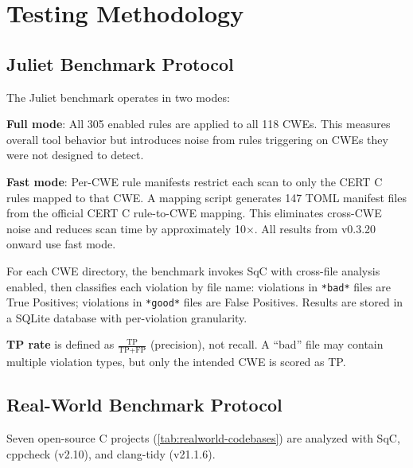 \section{Testing Methodology}
\label{sec:methodology}

\subsection{Juliet Benchmark Protocol}

The Juliet benchmark operates in two modes:

\textbf{Full mode}: All 305 enabled rules are applied to all 118 CWEs.  This
measures overall tool behavior but introduces noise from rules
triggering on CWEs they were not designed to detect.

\textbf{Fast mode}: Per-CWE rule manifests restrict each scan to only
the CERT C rules mapped to that CWE.  A mapping script generates 147
TOML manifest files from the official CERT C rule-to-CWE mapping.
This eliminates cross-CWE noise and reduces scan time by approximately
10$\times$.  All results from v0.3.20 onward use fast mode.

For each CWE directory, the benchmark invokes SqC with cross-file
analysis enabled, then classifies each violation by file name:
violations in \texttt{*bad*} files are True Positives; violations in
\texttt{*good*} files are False Positives.  Results are stored in a
SQLite database with per-violation granularity.

\textbf{TP rate} is defined as $\frac{\text{TP}}{\text{TP}+\text{FP}}$
(precision), not recall.  A ``bad'' file may contain multiple violation
types, but only the intended CWE is scored as TP.

\subsection{Real-World Benchmark Protocol}

Seven open-source C projects (\cref{tab:realworld-codebases}) are
analyzed with SqC, cppcheck (v2.10), and clang-tidy (v21.1.6).

